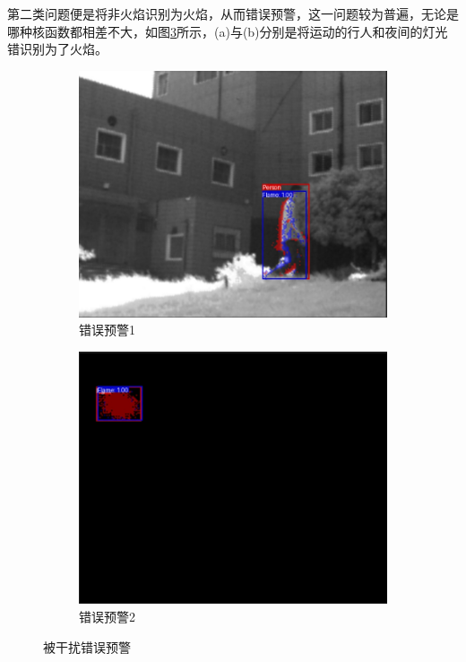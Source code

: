 第二类问题便是将非火焰识别为火焰，从而错误预警，这一问题较为普遍，无论是哪种核函数都相差不大，如图\ref{22}所示，(a)与(b)分别是将运动的行人和夜间的灯光错识别为了火焰。
\begin{figure}[ht]
    \centering
    \begin{subfigure}{0.49\textwidth}
        \centering
        \includegraphics[width=\textwidth]{figures/jiance4.png}
        \caption{错误预警1}
        \label{22.a}
    \end{subfigure}
    \hfill
    \begin{subfigure}{0.49\textwidth}
        \centering
        \includegraphics[width=\textwidth]{figures/jiance5.png}
        \caption{错误预警2}
        \label{22.b}
    \end{subfigure}
    \caption{被干扰错误预警}
    \label{22}
\end{figure}

